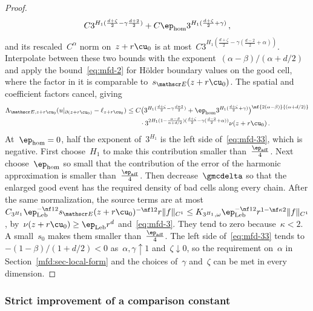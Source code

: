 \documentclass[11pt]{amsart}
\begin{document}
\begin{proof}
\begin{equation*}
	C3^{H_1(\frac{d+\zeta}{2}-\gamma\frac{d+2}{2})}
	+C\ep_{\rm hom}3^{H_1(\frac{d+\zeta}{2}+\gamma)}\,,
\end{equation*}
and its rescaled~$C^\alpha$ norm on~$z+r\cu_0$ is at most~$C3^{H_1(\frac{d+\zeta}{2}-\gamma(\frac{d-2}{2}+\alpha))}$. Interpolate between these two bounds with the exponent~$(\alpha-\beta)/(\alpha+d/2)$ and apply the bound~\eqref{eq:mfd-2} for H\"older boundary values on the good cell, where the factor in it is comparable to~$s_{\mathscr E}(z+r\cu_0)$. The spatial and coefficient factors cancel, giving
\begin{align*}
	\Lambda_{\mathscr E,z+r\cu_0}(u|_{\partial(z+r\cu_0)}-\ell_{z+r\cu_0})
	&\leq C\bigl(3^{H_1(\frac{d+\zeta}{2}-\gamma\frac{d+2}{2})}
	+\ep_{\rm hom}3^{H_1(\frac{d+\zeta}{2}+\gamma)}\bigr)^{\nf{2(\alpha-\beta)}{(\alpha+d/2)}}\\
	&\qquad\cdot3^{2H_1(1-\frac{\alpha-\beta}{\alpha+d/2})(\frac{d+\zeta}{2}-\gamma(\frac{d-2}{2}+\alpha))}\nu(z+r\cu_0)\,.
\end{align*}
At~$\ep_{\rm hom}=0$, half the exponent of~$3^{H_1}$ is the left side of~\eqref{eq:mfd-33}, which is negative. First choose~$H_1$ to make this contribution smaller than~$\frac{\ep_{\rm aff}}{4}$. Next choose~$\ep_{\rm hom}$ so small that the contribution of the error of the harmonic approximation is smaller than~$\frac{\ep_{\rm aff}}{4}$. Then decrease~$\gmcdelta$ so that the enlarged good event has the required density of bad cells along every chain. After the same normalization, the source terms are at most~$C_{3^{H_1}}\ep_{\rm Leb}^{-\nf12}s_{\mathscr E}(z+r\cu_0)^{-\nf12}r\|f\|_{C^1}\leq K_{3^{H_1},\omega}\ep_{\rm Leb}^{-\nf12}r^{1-\nf\kappa2}\|f\|_{C^1}$, by~$\nu(z+r\cu_0)\geq\ep_{\rm Leb} r^d$ and~\eqref{eq:mfd-3}. They tend to zero because~$\kappa<2$. A small~$s_0$ makes them smaller than~$\frac{\ep_{\rm aff}}{4}$. The left side of~\eqref{eq:mfd-33} tends to~$-(1-\beta)/(1+d/2)<0$ as~$\alpha,\gamma\uparrow1$ and~$\zeta\downarrow0$, so the requirement on~$\alpha$ in Section~\ref{mfd:sec-local-form} and the choices of~$\gamma$ and~$\zeta$ can be met in every dimension.
\end{proof}

\subsubsection{Strict improvement of a comparison constant}
\end{document}

